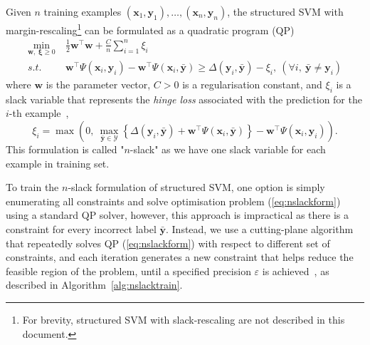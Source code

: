 \documentclass[9pt]{extarticle}
\newcommand{\eat}[1]{}
\begin{document}
Given $n$ training examples $(\mathbf{x}_1, \mathbf{y}_1), \dots, (\mathbf{x}_n, \mathbf{y}_n)$, 
the structured SVM with margin-rescaling\footnote{For brevity, structured SVM with slack-rescaling are not described in this document.}
can be formulated as a quadratic program (QP)
\begin{equation}
\label{eq:nslackform}
\begin{aligned}
\min_{\mathbf{w}, ~\bm{\xi} \ge 0} ~& \frac{1}{2} \mathbf{w}^\top \mathbf{w} + \frac{C}{n} \sum_{i=1}^n \xi_i \\
s.t.~~ ~& \mathbf{w}^\top \Psi(\mathbf{x}_i, \mathbf{y}_i) - \mathbf{w}^\top \Psi(\mathbf{x}_i, \bar{\mathbf{y}}) \ge 
       \Delta(\mathbf{y}_i, \bar{\mathbf{y}}) - \xi_i, ~(\forall i,~ \bar{\mathbf{y}} \neq \mathbf{y}_i)
\end{aligned}
\end{equation}
where $\mathbf{w}$ is the parameter vector, $C > 0$ is a regularisation constant, and $\xi_i$
is a slack variable that represents the \emph{hinge loss} associated with the prediction for the $i$-th example~\cite{tsochantaridis2005large},
\begin{equation*}
\xi_i = \max \left( 0,~ 
        \max_{\bar{\mathbf{y}} \in \mathcal{Y}} 
        \left\{ \Delta(\mathbf{y}_i, \bar{\mathbf{y}}) + \mathbf{w}^\top \Psi(\mathbf{x}_i, \bar{\mathbf{y}}) \right\} -
        \mathbf{w}^\top \Psi(\mathbf{x}_i, \mathbf{y}_i) \right).
\end{equation*}
This formulation is called "$n$-slack" as we have one slack variable for each example in training set. \eat{citation}

To train the $n$-slack formulation of structured SVM, one option is simply enumerating all constraints and 
solve optimisation problem (\ref{eq:nslackform}) using a standard QP solver, 
however, this approach is impractical as there is a constraint for every incorrect label $\bar{\mathbf{y}}$.
Instead, we use a cutting-plane algorithm that repeatedly solves QP (\ref{eq:nslackform}) with respect to different set of constraints, 
and each iteration generates a new constraint that helps reduce the feasible region of the problem, 
until a specified precision $\varepsilon$ is achieved~\cite{joachims2009predicting}, as described in Algorithm~\ref{alg:nslacktrain}.
\end{document}
